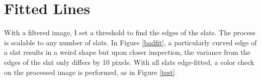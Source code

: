 \documentclass[10pt]{scrartcl}
\begin{document}
\section{Fitted Lines} %
\label{sec:fitted_lines}

With a filtered image, I set a threshold to find the edges of the slats. The process is scalable to any number of slats. In Figure \ref{badfit}, a particularly curved edge of a slat results in a weird shape but upon closer inspection, the variance from the edges of the slat only differs by 10 pixels. With all slats edge-fitted, a color check on the processed image is performed, as in Figure \ref{test}.

\begin{figure}[!ht]
{\caption{}
\label{edgefit}}
\end{figure}
\end{document}
